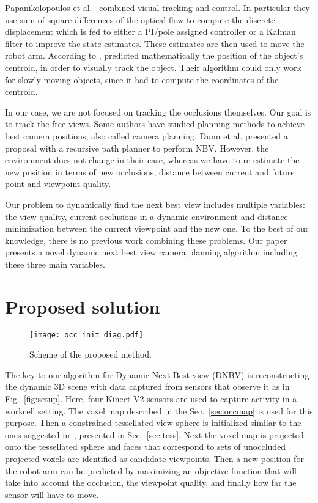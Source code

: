 \documentclass[10pt,twocolumn,letterpaper]{article}
\begin{document}
Papanikolopoulos et al.~\cite{Papanikolopoulos1993} combined visual tracking and control. In particular they use sum of square differences of the optical flow to compute the discrete displacement which is fed to either a PI/pole assigned controller or a Kalman filter to improve the state estimates. These estimates are then used to move the robot arm. According to \cite{Papanikolopoulos1993}, \cite{Hunt1982} predicted mathematically the position of the object's centroid, in order to visually track the object. Their algorithm could only work for slowly moving objects, since it had to compute the coordinates of the centroid. 

In our case, we are not focused on tracking the occlusions themselves. Our goal is to track the free views. Some authors have studied planning methods to achieve best camera positions, also called camera planning. Dunn et al. \cite{Dunn2009} presented a proposal with a recursive path planner to perform NBV. However, the environment does not change in their case, whereas we have to re-estimate the new position in terms of new occlusions, distance between current and future point and viewpoint quality. 

Our problem to dynamically find the next best view includes multiple variables: the view quality, current occlusions in a dynamic environment and distance minimization between the current viewpoint and the new one. To the best of our knowledge, there is no previous work combining these problems. Our paper presents a novel dynamic next best view camera planning algorithm including these three main variables. 


\section{Proposed solution}\label{sec:prop-sol}

\begin{figure*}[htb]
  \texttt{[image: occ\_init\_diag.pdf]}
  \centering
  \vspace{2mm}
  \caption{Scheme of the proposed method.}
  \label{fig:scheme}
\end{figure*}

The key to our algorithm for Dynamic Next Best view (DNBV) is reconstructing the dynamic 3D scene with data captured from sensors that observe it as in Fig.~\ref{fig:setup}. 
Here, four Kinect V2 sensors are used to capture activity in a workcell setting. 
The voxel map described in the Sec.~\ref{sec:occmap} is used for this purpose. 
Then a constrained tessellated view sphere is initialized similar to the ones suggested in~\cite{Massios1998, Morooka1998}, presented in Sec.~\ref{sec:tess}.
Next the voxel map is projected onto the tessellated sphere and faces that correspond to sets of unoccluded projected voxels are identified as candidate viewpoints. 
Then a new position for the robot arm can be predicted by maximizing an objective function that will take into account the occlusion, the viewpoint quality, and finally how far the sensor will have to move. 
\end{document}
